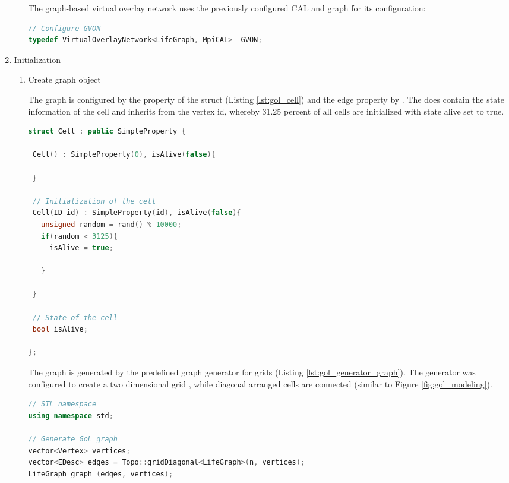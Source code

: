 \begin{enumerate}
\begin{enumerate}
  The graph-based virtual overlay network uses the previously configured
  CAL and graph for its configuration:

  \begin{lstlisting}[language=C++, label=lst:conf_gvon, caption={\ }]
// Configure GVON
typedef VirtualOverlayNetwork<LifeGraph, MpiCAL>  GVON;
  \end{lstlisting}

\end{enumerate}

\item Initialization
  \begin{enumerate}
  
  \item Create graph object

    The graph is configured by the property of the  struct
    (Listing \ref{lst:gol_cell}) and the edge property by
     .  The  does contain the state
    information of the cell and inherits from  the
    vertex id, whereby 31.25 percent of all cells are initialized with
    state alive set to true.  

    \begin{lstlisting}[language=C++, label=lst:gol_cell, caption={\ }]
struct Cell : public SimpleProperty { 

 Cell() : SimpleProperty(0), isAlive(false){ 
          
 }
        
 // Initialization of the cell
 Cell(ID id) : SimpleProperty(id), isAlive(false){ 
   unsigned random = rand() % 10000;
   if(random < 3125){ 
     isAlive = true;
     
   }
   
 }

 // State of the cell
 bool isAlive;
 
};
    \end{lstlisting}

    The graph is generated by the predefined graph generator for grids
    (Listing \ref{lst:gol_generator_graph}). The generator was
    configured to create a two dimensional grid , while diagonal
    arranged cells are connected (similar to Figure \ref{fig:gol_modeling}).

  \begin{lstlisting}[language=C++, label=lst:gol_generator_graph, caption={\ }]
// STL namespace
using namespace std;

// Generate GoL graph
vector<Vertex> vertices;
vector<EDesc> edges = Topo::gridDiagonal<LifeGraph>(n, vertices);
LifeGraph graph (edges, vertices); 
  \end{lstlisting}


\end{enumerate}
\end{enumerate}
